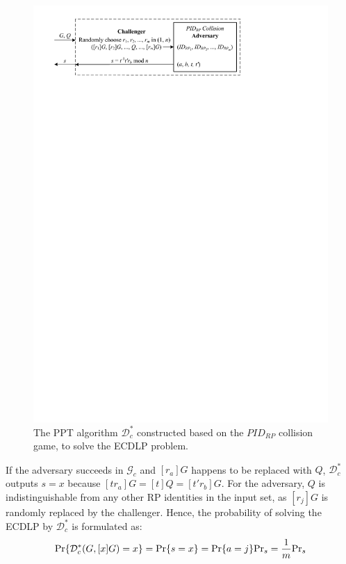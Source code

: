 \begin{figure}[tb]
  \centering
  \includegraphics[width=0.97\linewidth]{fig/ecdlp_algorithm.pdf}
  \caption{The PPT algorithm $\mathcal{D}^*_c$ constructed based on the $PID_{RP}$ collision game, to solve the ECDLP problem.}
  \label{fig:ecdlp_algorithm}
\end{figure}

If the adversary succeeds in $\mathcal{G}_c$ and $[r_a]G$ happens to be replaced with $Q$,
 $\mathcal{D}^*_c$ outputs $s=x$ because $[tr_a]G = [t]Q = [t'r_b]G$. For the adversary, $Q$ is indistinguishable from any other RP identities in the input set, as $[r_j]G$ is randomly replaced by the challenger.
Hence, the probability of solving the ECDLP by $\mathcal{D}^*_c$ is formulated as:
\begin{equation*}
{\rm Pr}\{\mathcal{D}^*_c(G, [x]G)=x\} = {\rm Pr}\{s = x\}={\rm Pr}\{a=j\}{\rm Pr}_s=\frac{1}{m}{\rm Pr}_s
\end{equation*}

